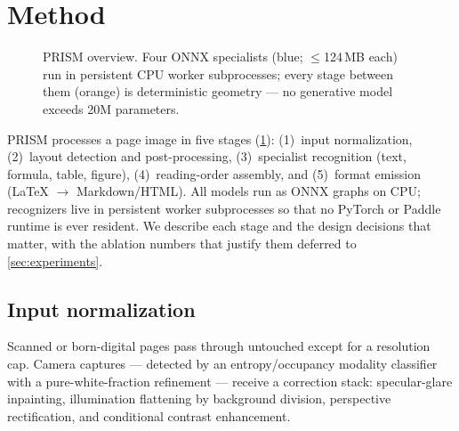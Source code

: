 \section{Method}
\label{sec:method}

\begin{figure}[t]
  \centering
  \resizebox{\linewidth}{!}{}
  \caption{PRISM overview. Four ONNX specialists (blue; $\leq$124\,MB each) run in persistent CPU worker subprocesses; every stage between them (orange) is deterministic geometry --- no generative model exceeds 20M parameters.}
  \label{fig:arch}
\end{figure}

PRISM processes a page image in five stages (\cref{fig:arch}): (1)~input normalization, (2)~layout detection and post-processing, (3)~specialist recognition (text, formula, table, figure), (4)~reading-order assembly, and (5)~format emission (\LaTeX{} $\rightarrow$ Markdown/HTML). All models run as ONNX graphs on CPU; recognizers live in persistent worker subprocesses so that no PyTorch or Paddle runtime is ever resident. We describe each stage and the design decisions that matter, with the ablation numbers that justify them deferred to \cref{sec:experiments}.

\subsection{Input normalization}
\label{sec:normalization}

Scanned or born-digital pages pass through untouched except for a resolution cap. Camera captures --- detected by an entropy/occupancy modality classifier with a pure-white-fraction refinement --- receive a correction stack: specular-glare inpainting, illumination flattening by background division, perspective rectification, and conditional contrast enhancement.

